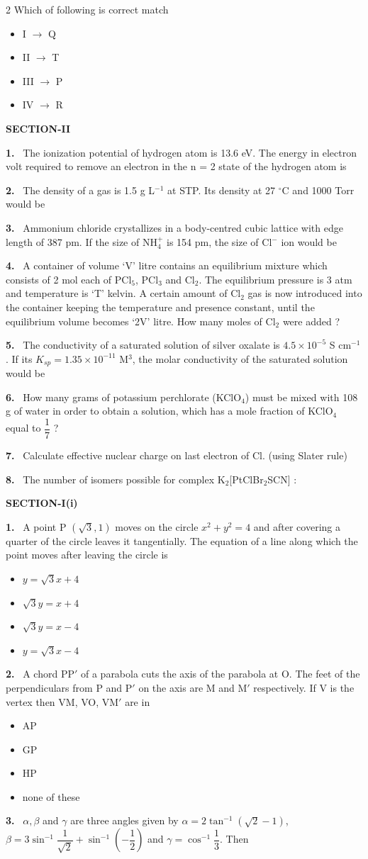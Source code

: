 \documentclass[10pt]{extarticle}
\newcommand{\partsec}[2]{\par\medskip\noindent{\large\bfseries PART-#1: #2}\par\smallskip}
\newcommand{\sect}[1]{\par\smallskip\noindent\textbf{#1}\par}
\newcommand{\qn}[1]{\par\smallskip\noindent\textbf{#1.}~}
\newenvironment{qoptions}{\begin{itemize}[leftmargin=1.8em,itemsep=1pt,topsep=2pt,label={}]}{\end{itemize}}
\newcommand{\opt}[2]{\item[(#1)] #2}
\begin{document}
\begin{multicols}{2}
Which of following is correct match
\begin{qoptions}
\opt{A}{I $\rightarrow$ Q}
\opt{B}{II $\rightarrow$ T}
\opt{C}{III $\rightarrow$ P}
\opt{D}{IV $\rightarrow$ R}
\end{qoptions}
\sect{SECTION-II}
\qn{1} The ionization potential of hydrogen atom is 13.6 eV. The energy in electron volt required to remove an electron in the n = 2 state of the hydrogen atom is
\qn{2} The density of a gas is 1.5 g L$^{-1}$ at STP. Its density at 27 $^\circ$C and 1000 Torr would be
\qn{3} Ammonium chloride crystallizes in a body-centred cubic lattice with edge length of 387 pm. If the size of NH$_4^+$ is 154 pm, the size of Cl$^-$ ion would be
\qn{4} A container of volume `V' litre contains an equilibrium mixture which consists of 2 mol each of PCl$_5$, PCl$_3$ and Cl$_2$. The equilibrium pressure is 3 atm and temperature is `T' kelvin. A certain amount of Cl$_2$ gas is now introduced into the container keeping the temperature and presence constant, until the equilibrium volume becomes `2V' litre. How many moles of Cl$_2$ were added ?
\qn{5} The conductivity of a saturated solution of silver oxalate is $4.5\times10^{-5}$ S cm$^{-1}$. If its $K_{sp}=1.35\times10^{-11}$ M$^3$, the molar conductivity of the saturated solution would be
\qn{6} How many grams of potassium perchlorate (KClO$_4$) must be mixed with 108 g of water in order to obtain a solution, which has a mole fraction of KClO$_4$ equal to $\dfrac17$ ?
\qn{7} Calculate effective nuclear charge on last electron of Cl. (using Slater rule)
\qn{8} The number of isomers possible for complex K$_2$[PtClBr$_2$SCN] :
\partsec{3}{MATHEMATICS}
\sect{SECTION-I(i)}
\qn{1} A point P $(\sqrt3,1)$ moves on the circle $x^2+y^2=4$ and after covering a quarter of the circle leaves it tangentially. The equation of a line along which the point moves after leaving the circle is
\begin{qoptions}
\opt{A}{$y=\sqrt3x+4$}
\opt{B}{$\sqrt3y=x+4$}
\opt{C}{$\sqrt3y=x-4$}
\opt{D}{$y=\sqrt3x-4$}
\end{qoptions}
\qn{2} A chord PP$'$ of a parabola cuts the axis of the parabola at O. The feet of the perpendiculars from P and P$'$ on the axis are M and M$'$ respectively. If V is the vertex then VM, VO, VM$'$ are in
\begin{qoptions}
\opt{A}{AP}
\opt{B}{GP}
\opt{C}{HP}
\opt{D}{none of these}
\end{qoptions}
\qn{3} $\alpha,\beta$ and $\gamma$ are three angles given by $\alpha=2\tan^{-1}\left(\sqrt2-1\right)$, $\beta=3\sin^{-1}\dfrac1{\sqrt2}+\sin^{-1}\left(-\dfrac12\right)$ and $\gamma=\cos^{-1}\dfrac13$. Then

\end{multicols}
\end{document}
